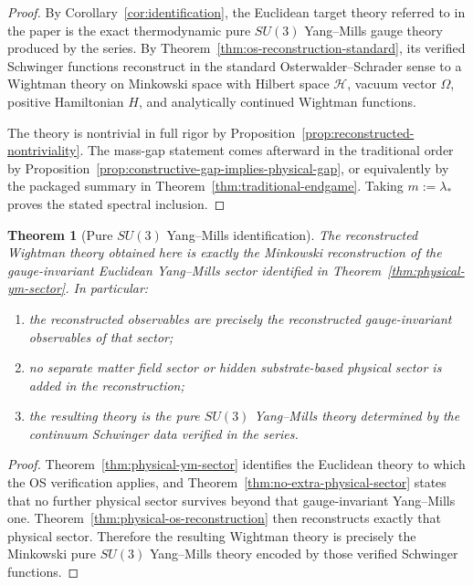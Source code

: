\documentclass[11pt]{article}
\newtheorem{theorem}{Theorem}[section]
\theoremstyle{definition}
\theoremstyle{remark}
\newcommand{\mcH}{\mathcal H}
\begin{document}
\begin{proof}
By Corollary~\ref{cor:identification}, the Euclidean target theory referred to
in the paper is the exact thermodynamic pure $SU(3)$ Yang--Mills gauge
theory produced by the series.  By Theorem~\ref{thm:os-reconstruction-standard}, its verified
Schwinger functions reconstruct in the standard Osterwalder--Schrader sense to
a Wightman theory on Minkowski space with Hilbert space $\mcH$, vacuum vector
$\Omega$, positive Hamiltonian $H$, and analytically continued Wightman
functions.

The theory is nontrivial in full rigor by
Proposition~\ref{prop:reconstructed-nontriviality}.  The mass-gap statement
comes afterward in the traditional order by
Proposition~\ref{prop:constructive-gap-implies-physical-gap}, or equivalently by
the packaged summary in Theorem~\ref{thm:traditional-endgame}.
Taking $m:=\lambda_*$ proves the stated spectral inclusion.
\end{proof}

\begin{theorem}[Pure \(SU(3)\) Yang--Mills identification]
\label{thm:pure-ym-identification}
The reconstructed Wightman theory obtained here is exactly the
Minkowski reconstruction of the gauge-invariant Euclidean Yang--Mills sector
identified in Theorem~\ref{thm:physical-ym-sector}.  In particular:
\begin{enumerate}[label=\textnormal{(\roman*)},leftmargin=1.5em]
\item the reconstructed observables are precisely the reconstructed
gauge-invariant observables of that sector;
\item no separate matter field sector or hidden substrate-based physical sector
is added in the reconstruction;
\item the resulting theory is the pure \(SU(3)\) Yang--Mills theory determined
by the continuum Schwinger data verified in the series.
\end{enumerate}
\end{theorem}

\begin{proof}
Theorem~\ref{thm:physical-ym-sector} identifies the Euclidean theory to which
the OS verification applies, and Theorem~\ref{thm:no-extra-physical-sector}
states that no further physical sector survives beyond that gauge-invariant
Yang--Mills one.  Theorem~\ref{thm:physical-os-reconstruction} then reconstructs
exactly that physical sector.  Therefore the resulting Wightman theory is
precisely the Minkowski pure \(SU(3)\) Yang--Mills theory encoded by those
verified Schwinger functions.
\end{proof}
\end{document}
